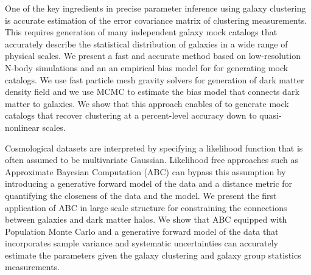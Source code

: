 One of the key ingredients in precise parameter inference using galaxy clustering is accurate estimation of the error covariance matrix of clustering measurements. This requires generation of many independent galaxy mock catalogs that accurately describe the statistical distribution of galaxies in a wide range of physical scales. We present a fast and accurate method based on low-resolution N-body simulations and an an empirical bias model for for generating mock catalogs. We use fast particle mesh gravity solvers for generation of dark matter density field and we use MCMC to estimate the bias model that connects dark matter to galaxies. We show that this approach enables of to generate mock catalogs that recover clustering at a percent-level accuracy down to quasi-nonlinear scales. 

Cosmological datasets are interpreted by specifying a likelihood function that is often assumed to be multivariate Gaussian. Likelihood free approaches such as Approximate Bayesian Computation (ABC) can bypass this assumption by introducing a generative forward model of the data and a distance metric for quantifying the closeness of the data and the model. We present the first application of ABC in large scale structure for constraining the connections between galaxies and dark matter halos. We show that ABC equipped with Population Monte Carlo and a generative forward model of the data that incorporates sample variance and systematic uncertainties can accurately estimate the parameters given the galaxy clustering and galaxy group statistics measurements.  
